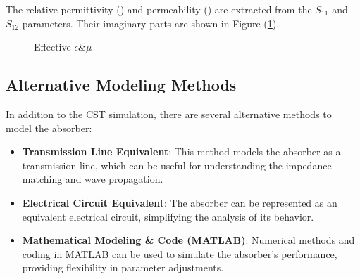         The relative permittivity (\epsilon) and permeability (\mu) are extracted 
        from the $S_{11}$ and $S_{12}$ parameters. Their imaginary parts are shown 
        in Figure (\ref{plt:EpsilonMu}).
        \begin{figure}[h]
            \centering
            \caption{\textsf{Effective $\epsilon \& \mu$}}
            \label{plt:EpsilonMu}
        \end{figure}
        

        \subsection{\textsf{Alternative Modeling Methods}}

            In addition to the CST simulation, there are several alternative methods
            to model the absorber:
            \begin{itemize}
                \item \textbf{Transmission Line Equivalent}: This method models the 
                    absorber as a transmission line, which can be useful for 
                    understanding the impedance matching and wave propagation.
                \item \textbf{Electrical Circuit Equivalent}: The absorber can be 
                    represented as an equivalent electrical circuit, simplifying the
                    analysis of its behavior.
                \item \textbf{Mathematical Modeling \& Code (MATLAB)}: Numerical methods
                    and coding in MATLAB can be used to simulate the absorber's 
                    performance, providing flexibility in parameter adjustments.
            \end{itemize}
        
